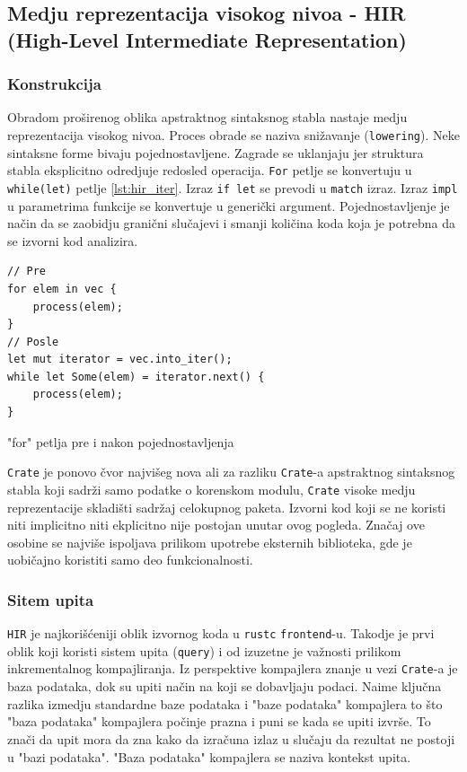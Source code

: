 \subsection{Medju reprezentacija visokog nivoa - HIR (High-Level Intermediate Representation)}

\subsubsection{Konstrukcija}

Obradom proširenog oblika apstraktnog sintaksnog stabla nastaje medju reprezentacija visokog nivoa.
Proces obrade se naziva snižavanje (\verb|lowering|). Neke sintaksne forme bivaju pojednostavljene.
Zagrade se uklanjaju jer struktura stabla eksplicitno odredjuje redosled operacija. \verb|For| petlje 
se konvertuju u \verb|while(let)| petlje \ref{lst:hir_iter}. Izraz \verb|if let| se prevodi 
u \verb|match| izraz. Izraz \verb|impl| u parametrima funkcije se konvertuje u generički argument.
Pojednostavljenje je način da se zaobidju granični slučajevi i smanji količina koda koja je potrebna 
da se izvorni kod analizira.

\begin{listing}[H]
\begin{verbatim}
// Pre
for elem in vec {
    process(elem);
}
// Posle
let mut iterator = vec.into_iter();
while let Some(elem) = iterator.next() {
    process(elem);
}
\end{verbatim}
\caption{"for" petlja pre i nakon pojednostavljenja}
\label{lst:hir_iter}
\end{listing}

\verb|Crate| je ponovo čvor najvišeg nova ali za razliku \verb|Crate|-a apstraktnog sintaksnog stabla koji sadrži
samo podatke o korenskom modulu, \verb|Crate| visoke medju reprezentacije skladišti sadržaj celokupnog paketa.
Izvorni kod koji se ne koristi niti implicitno niti ekplicitno nije postojan unutar ovog pogleda. Značaj 
ove osobine se najviše ispoljava prilikom upotrebe eksternih biblioteka, gde je uobičajno koristiti samo 
deo funkcionalnosti.

\subsubsection{Sitem upita}

\verb|HIR| je najkorišćeniji oblik izvornog koda u \verb|rustc| \verb|frontend|-u. Takodje je prvi oblik koji 
koristi sistem upita (\verb|query|) i od izuzetne je važnosti prilikom inkrementalnog kompajliranja.
Iz perspektive kompajlera znanje u vezi \verb|Crate|-a je baza podataka, dok su upiti način na koji 
se dobavljaju podaci. Naime ključna razlika izmedju standardne baze podataka i "baze podataka" kompajlera
to što "baza podataka" kompajlera počinje prazna i puni se kada se upiti izvrše. To znači da upit mora 
da zna kako da izračuna izlaz u slučaju da rezultat ne postoji u "bazi podataka". "Baza podataka" kompajlera 
se naziva kontekst upita.

